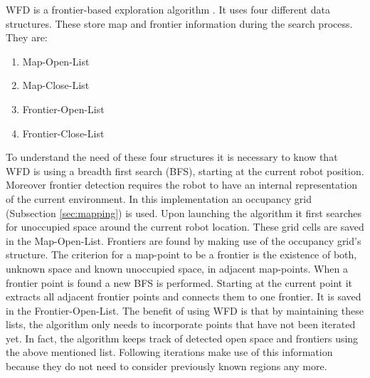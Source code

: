 \documentclass{ba-kecs}
\begin{document}
WFD is a frontier-based exploration algorithm \citep{Keidar}. It uses four different data structures. These store map and frontier information during the search process. They are:
\begin{enumerate}
\item{Map-Open-List}
\item{Map-Close-List}
\item{Frontier-Open-List}
\item{Frontier-Close-List}
\end{enumerate}
To understand the need of these four structures it is necessary to know that WFD is using a breadth first search (BFS), starting at the current robot position. Moreover frontier detection requires the robot to have an internal representation of the current environment. In this implementation an occupancy grid (Subsection \ref{sec:mapping}) is used.
Upon launching the algorithm it first searches for unoccupied space around the current robot location. These grid cells are saved in the Map-Open-List. 
Frontiers are found by making use of the occupancy grid's structure. The criterion for a map-point to be a frontier is the existence of both, unknown space and known unoccupied space, in adjacent map-points. When a frontier point is found a new BFS is performed. Starting at the current point it extracts all adjacent frontier points and connects them to one frontier. It is saved in the Frontier-Open-List. The benefit of using WFD is that by maintaining these lists, the algorithm only needs to incorporate points that have not been iterated yet. In fact, the algorithm keeps track of detected open space and frontiers using the above mentioned list. Following iterations make use of this information because they do not need to consider previously known regions any more.
 
\end{document}

